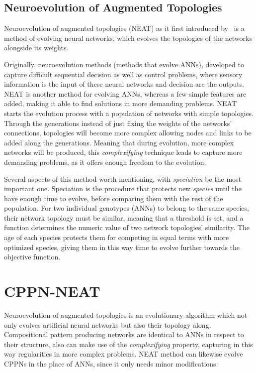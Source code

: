 \subsection{Neuroevolution of Augmented Topologies}

Neuroevolution of augmented topologies (NEAT) as it first introduced by~\cite{stanley2002evolving} is a method of evolving neural networks, which evolves the topologies of the networks alongside its weights.

Originally, neuroevolution methods (methods that evolve ANNs), developed to capture difficult sequential decision as well as control problems, where sensory information is the input of these neural networks and decision are the outputs. NEAT is another method for evolving ANNs, whereas a few simple features are added, making it able to find solutions in more demanding problems. NEAT starts the evolution process with a population of networks with simple topologies. Through the generations instead of just fixing the weights of the networks' connections, topologies will become more complex allowing nodes and links to be added along the generations. Meaning that during evolution, more complex networks will be produced, this \emph{complexifying} technique leads to capture more demanding problems, as it offers enough freedom to the evolution.

Several aspects of this method worth mentioning, with \emph{speciation} be the most important one. Speciation is the procedure that protects new \emph{species} until the have enough time to evolve, before comparing them with the rest of the population. For two individual genotypes (ANNs) to belong to the same species, their network topology must be similar, meaning that a threshold is set, and a function determines the numeric value of two network topologies' similarity. The age of each species protects them for competing in equal terms with more optimized species, giving them in this way time to evolve further towards the objective function.



\section{CPPN-NEAT}

Neuroevolution of augmented topologies is an evolutionary algorithm which not only evolves artificial neural networks but also their topology along. Compositional pattern producing networks are identical to ANNs in respect to their structure, also can make use of the \emph{complexifying} property, capturing in this way regularities in more complex problems. NEAT method can likewise evolve CPPNs in the place of ANNs, since it only needs minor modifications.

